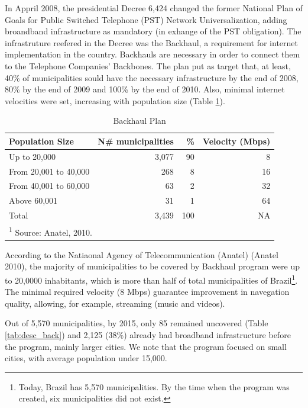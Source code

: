 \documentclass[12pt,]{article}
\let\rmarkdownfootnote\footnote%
\def\footnote{\protect\rmarkdownfootnote}
\begin{document}
In Appril 2008, the presidential Decree 6,424 changed the former
National Plan of Goals for Public Switched Telephone (PST) Network
Universalization, adding broandband infrastructure as mandatory (in
exhange of the PST obligation). The infrastruture reefered in the Decree
was the Backhaul, a requirement for internet implementation in the
country. Backhauls are necessary in order to connect them to the
Telephone Companies' Backbones. The plan put as target that, at least,
40\% of municipalities sould have the necessary infrastructure by the
end of 2008, 80\% by the end of 2009 and 100\% by the end of 2010. Also,
minimal internet velocities were set, increasing with population size
(Table \ref{tab:program_backhauk}).

\begin{table}[!h]

\caption{\label{tab:program_backhauk}Backhaul Plan}
\centering
\begin{tabular}{lrrr}
\toprule
Population Size & N\# municipalities & \% & Velocity (Mbps)\\
\midrule
Up to 20,000 & 3,077 & 90 & 8\\
From 20,001 to 40,000 & 268 & 8 & 16\\
From 40,001 to 60,000 & 63 & 2 & 32\\
Above 60,001 & 31 & 1 & 64\\
Total & 3,439 & 100 & NA\\
\bottomrule
\multicolumn{4}{l}{\textsuperscript{1} Source: Anatel, 2010.}\\
\end{tabular}
\end{table}

According to the Natiaonal Agency of Telecommunication (Anatel) (Anatel
2010), the majority of municipalities to be covered by Backhaul program
were up to 20,0000 inhabitants, which is more than half of total
municipalities of Brazil\footnote{Today, Brazil has 5,570
  municipalities. By the time when the program was created, six
  municipalities did not exist.}. The minimal required velocity (8 Mbps)
guarantee improvement in navegation quality, allowing, for example,
streaming (music and videos).

Out of 5,570 municipalities, by 2015, only 85 remained uncovered (Table
\ref{tab:desc_back}) and 2,125 (38\%) already had broadband
infrastructure before the program, mainly larger cities. We note that
the program focused on small cities, with average population under
15,000.
\end{document}
